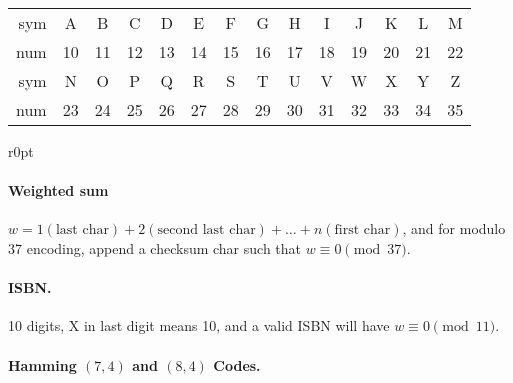 \documentclass[11pt,twocolumn]{scrartcl}
\begin{document}
\begin{tabular}{r || c c c c c c c c c c c c c}
    sym & A & B & C & D & E & F & G & H & I & J & K & L & M\\
    num & 10& 11& 12& 13& 14& 15& 16& 17& 18& 19& 20& 21& 22\\
    \hline\hline
    sym & N & O & P & Q & R & S & T & U & V & W & X & Y & Z\\
    num & 23& 24& 25& 26& 27& 28& 29& 30& 31& 32& 33& 34& 35\\
    \hline\hline
\end{tabular}
\begin{wrapfigure}{r}{0pt}
\def\firstcircle{(0,0) circle (1cm)}
\def\secondcircle{(0:1.2cm) circle (1cm)}
\def\thirdcircle{(300:1.2cm) circle (1cm)}
\end{wrapfigure}

\paragraph{Weighted sum} $w = 1(\text{last char}) + 2(\text{second last char}) + \dots + n(\text{first char})$,
and for modulo 37 encoding, append a checksum char such that $w \equiv 0 \pmod{37}$.

\paragraph{ISBN.}
10 digits, X in last digit means 10, and a valid ISBN will have $w \equiv 0 \pmod{11}$.

\paragraph{Hamming $(7,4)$ and $(8,4)$ Codes.}
\end{document}
